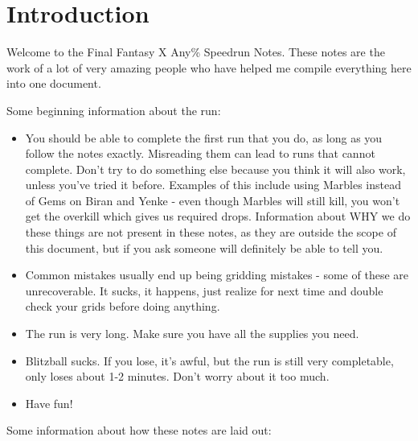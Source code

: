 \chapter{Introduction}

Welcome to the Final Fantasy X Any\% Speedrun Notes. These notes are the work of a lot of very amazing people who have helped me compile everything here into one document.

Some beginning information about the run:

\begin{itemize}
	\item You should be able to complete the first run that you do, as long as you follow the notes exactly. Misreading them can lead to runs that cannot complete. Don't try to do something else because you think it will also work, unless you've tried it before. Examples of this include using Marbles instead of Gems on Biran and Yenke - even though Marbles will still kill, you won't get the overkill which gives us required drops. Information about WHY we do these things are not present in these notes, as they are outside the scope of this document, but if you ask someone will definitely be able to tell you.
	\item Common mistakes usually end up being gridding mistakes - some of these are unrecoverable. It sucks, it happens, just realize for next time and double check your grids before doing anything.
	\item The run is very long. Make sure you have all the supplies you need.
	\item Blitzball sucks. If you lose, it's awful, but the run is still very completable, only loses about 1-2 minutes. Don't worry about it too much.
	\item Have fun!
\end{itemize}

Some information about how these notes are laid out:

